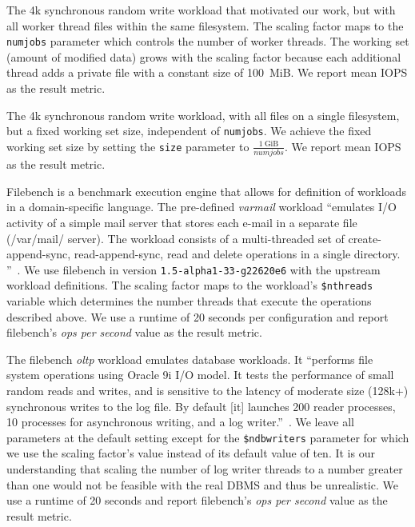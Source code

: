\documentclass[12pt,a4paper,twoside]{book}
\begin{document}
\begin{description}[noitemsep,leftmargin=1.5cm,labelindent=1cm]
    \item[fio-growing] The 4k synchronous random write workload that motivated our work, but with all worker thread files within the same filesystem.
        The scaling factor maps to the \lstinline{numjobs} parameter which controls the number of worker threads.
        The working set (amount of modified data) grows with the scaling factor because each additional thread adds a private file with a constant size of 100~MiB.
        We report mean IOPS as the result metric.

    \item[fio-fixed] The 4k synchronous random write workload, with all files on a single filesystem, but a fixed working set size, independent of \lstinline{numjobs}.
        We achieve the fixed working set size by setting the \lstinline{size} parameter to $\frac{1~\text{GiB}}{numjobs}$.
        We report mean IOPS as the result metric.

    \item[filebench varmail] Filebench is a benchmark execution engine that allows for definition of workloads in a domain-specific language.
        The pre-defined \textit{varmail} workload
        ``emulates I/O activity of a simple mail server that stores each e-mail in a separate file (/var/mail/ server).
          The workload consists of a multi-threaded set of create-append-sync, read-append-sync, read and delete operations in a single directory.
        ''~\cite{FilebenchGitHubWiki}.
        We use filebench in version \lstinline{1.5-alpha1-33-g22620e6} with the upstream workload definitions.
        The scaling factor maps to the workload's \lstinline{$nthreads} variable which determines the number threads that execute the operations described above.
        We use a runtime of 20 seconds per configuration and report filebench's \textit{ops per second} value as the result metric.

    \item[filebench oltp] The filebench \textit{oltp} workload emulates database workloads.
        It ``performs file system operations using Oracle 9i I/O model.
        It tests the performance of small random reads and writes, and is sensitive to the latency of moderate size (128k+) synchronous writes to the log file.
        By default [it] launches 200 reader processes, 10 processes for asynchronous writing, and a log writer.''~\cite{FilebenchGitHubWiki}.
        We leave all parameters at the default setting except for the \lstinline{$ndbwriters} parameter for which we use the scaling factor's value instead of its default value of ten.
        It is our understanding that scaling the number of log writer threads to a number greater than one would not be feasible with the real DBMS and thus be unrealistic.
        We use a runtime of 20 seconds and report filebench's \textit{ops per second} value as the result metric.


\end{description}
\end{document}
